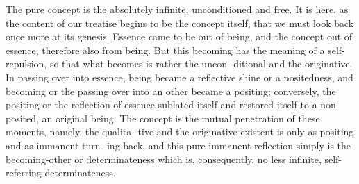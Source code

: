The pure concept is the absolutely infinite, unconditioned and free. It is
here, as the content of our treatise begins to be the concept itself, that we
must look back once more at its genesis. Essence came to be out of being, and
the concept out of essence, therefore also from being. But this becoming
has the meaning of a self-repulsion, so that what becomes is rather the uncon-
ditional and the originative. In passing over into essence, being became a
reflective shine or a positedness, and becoming or the passing over into an
other became a positing; conversely, the positing or the reflection of essence
sublated itself and restored itself to a non-posited, an original being. The
concept is the mutual penetration of these moments, namely, the qualita-
tive and the originative existent is only as positing and as immanent turn-
ing back, and this pure immanent reflection simply is the becoming-other
or determinateness which is, consequently, no less infinite, self-referring
determinateness.

